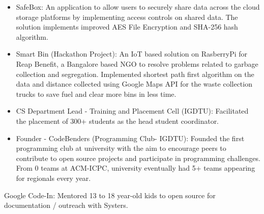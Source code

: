 \documentclass[9.5pt,a4paper]{altacv}
\begin{document}
\medskip

\begin{itemize}
    \item {\color{emphasis}SafeBox:} An application to allow users to securely share data across the cloud storage platforms by implementing access controls on shared data. The solution implements improved AES File Encryption and SHA-256 hash algorithm.
    
    \divider
    \item {\color{emphasis}Smart Bin (Hackathon Project):} An IoT based solution on RasberryPi for Reap Benefit, a Bangalore based NGO to resolve problems related to garbage collection and segregation. Implemented shortest path first algorithm on the data and distance collected using Google Maps API for the waste collection trucks to save fuel and clear more bins in less time.
\end{itemize}

\vspace{0.8em}

\begin{itemize}
    \item {\color{emphasis}CS Department Lead - Training and Placement Cell (IGDTU):} Facilitated the placement of 300+ students as the head student coordinator.
    \smallskip
    \item {\color{emphasis}Founder - CodeBenders (Programming Club- IGDTU):} Founded the first programming club at university with the aim to encourage peers to contribute to open source projects and participate in programming challenges. From 0 teams at ACM-ICPC, university eventually had 5+ teams appearing for regionals every year.
\end{itemize}

\divider

\vspace{0.2em}

{\color{emphasis}Google Code-In:} Mentored 13 to 18 year-old kids to open source for documentation / outreach with Systers.
\end{document}
